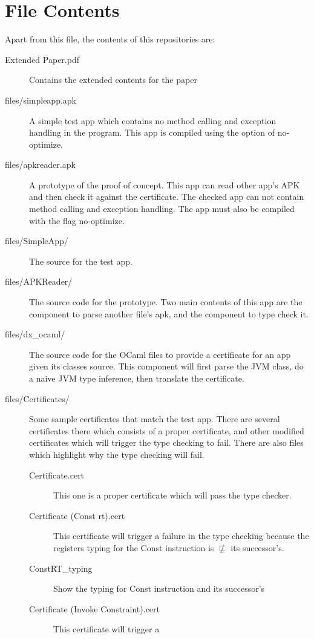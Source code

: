 \documentclass[a4]{article}
\begin{document}
\section{File Contents}
Apart from this file, the contents of this repositories are:
\begin{description}
  \item[Extended Paper.pdf] Contains the extended contents for the paper
  \item[files/simpleapp.apk] A simple test app which contains no method calling and    
    exception handling in the program. This app is compiled using the option of 
    no-optimize.
  \item[files/apkreader.apk] A prototype of the proof of concept. This app can read other
    app's APK and then check it against the certificate. The checked app can not contain
    method calling and exception handling. The app must also be compiled with the flag
    no-optimize.
  \item[files/SimpleApp/] The source for the test app.
  \item[files/APKReader/] The source code for the prototype. Two main contents of this
    app are the component to parse another file's apk, and the component to 
    type check it.
  \item[files/dx\_ocaml/] The source code for the OCaml files to provide a certificate
    for an app given its classes source. This component will first parse the JVM class,
    do a naive JVM type inference, then translate the certificate. 
  \item[files/Certificates/] Some sample certificates that match the test app. There are
    several certificates there which consists of a proper certificate, and other
    modified certificates which will trigger the type checking to fail. 
    There are also files which highlight why the type checking will fail.
    \begin{description}
      \item[Certificate.cert] This one is a proper certificate which will pass the type
        checker.
      \item[Certificate (Const rt).cert] This certificate will trigger a failure in the
        type checking because the registers typing for the Const instruction is 
        $\nsqsubseteq$ its successor's.
      \item[ConstRT\_typing] Show the typing for Const instruction and its successor's
      \item[Certificate (Invoke Constraint).cert] This certificate will trigger a 

\end{description}
\end{description}
\end{document}

